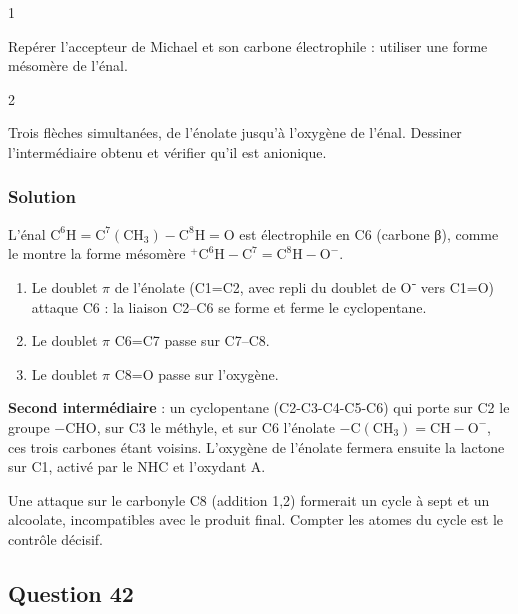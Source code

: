 \documentclass[11pt,a4paper]{article}
\providecommand{\tightlist}{\setlength{\itemsep}{0pt}\setlength{\parskip}{0pt}}
\begin{document}
\begin{indication}{1}

Repérer l'accepteur de Michael et son carbone électrophile : utiliser une forme mésomère de l'énal.

\end{indication}

\begin{indication}{2}

Trois flèches simultanées, de l'énolate jusqu'à l'oxygène de l'énal. Dessiner l'intermédiaire obtenu et vérifier qu'il est anionique.

\end{indication}

\hypertarget{solution-40}{%
\subsubsection{Solution}\label{solution-40}}

L'énal \(\mathrm{C^6H{=}C^7(CH_3){-}C^8H{=}O}\) est électrophile en C6 (carbone β), comme le montre la forme mésomère \(\mathrm{^+C^6H{-}C^7{=}C^8H{-}O^-}\).

\begin{enumerate}
\def\labelenumi{\arabic{enumi}.}
\tightlist
\item
  Le doublet \(\pi\) de l'énolate (C1=C2, avec repli du doublet de O⁻ vers C1=O) attaque C6 : la liaison C2--C6 se forme et ferme le cyclopentane.
\item
  Le doublet \(\pi\) C6=C7 passe sur C7--C8.
\item
  Le doublet \(\pi\) C8=O passe sur l'oxygène.
\end{enumerate}

\textbf{Second intermédiaire} : un cyclopentane (C2-C3-C4-C5-C6) qui porte sur C2 le groupe \(\mathrm{-CHO}\), sur C3 le méthyle, et sur C6 l'énolate \(\mathrm{-C(CH_3){=}CH{-}O^-}\), ces trois carbones étant voisins. L'oxygène de l'énolate fermera ensuite la lactone sur C1, activé par le NHC et l'oxydant A.

\begin{piege}

Une attaque sur le carbonyle C8 (addition 1,2) formerait un cycle à sept et un alcoolate, incompatibles avec le produit final. Compter les atomes du cycle est le contrôle décisif.

\end{piege}

\hypertarget{question-42}{%
\subsection{Question 42}\label{question-42}}
\end{document}
